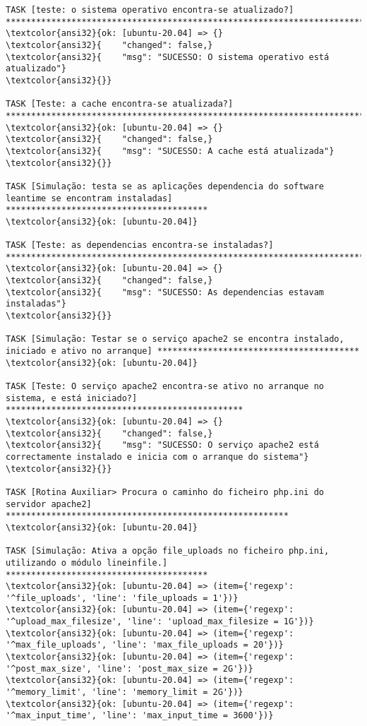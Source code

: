 \documentclass{scrartcl}
\begin{document}
\begin{Verbatim}
TASK [teste: o sistema operativo encontra-se atualizado?] ********************************************************************************
\textcolor{ansi32}{ok: [ubuntu-20.04] => {}
\textcolor{ansi32}{    "changed": false,}
\textcolor{ansi32}{    "msg": "SUCESSO: O sistema operativo está atualizado"}
\textcolor{ansi32}{}}

TASK [Teste: a cache encontra-se atualizada?] ********************************************************************************************
\textcolor{ansi32}{ok: [ubuntu-20.04] => {}
\textcolor{ansi32}{    "changed": false,}
\textcolor{ansi32}{    "msg": "SUCESSO: A cache está atualizada"}
\textcolor{ansi32}{}}

TASK [Simulação: testa se as aplicações dependencia do software leantime se encontram instaladas] ****************************************
\textcolor{ansi32}{ok: [ubuntu-20.04]}

TASK [Teste: as dependencias encontra-se instaladas?] ************************************************************************************
\textcolor{ansi32}{ok: [ubuntu-20.04] => {}
\textcolor{ansi32}{    "changed": false,}
\textcolor{ansi32}{    "msg": "SUCESSO: As dependencias estavam instaladas"}
\textcolor{ansi32}{}}

TASK [Simulação: Testar se o serviço apache2 se encontra instalado, iniciado e ativo no arranque] ****************************************
\textcolor{ansi32}{ok: [ubuntu-20.04]}

TASK [Teste: O serviço apache2 encontra-se ativo no arranque no sistema, e está iniciado?] ***********************************************
\textcolor{ansi32}{ok: [ubuntu-20.04] => {}
\textcolor{ansi32}{    "changed": false,}
\textcolor{ansi32}{    "msg": "SUCESSO: O serviço apache2 está correctamente instalado e inicia com o arranque do sistema"}
\textcolor{ansi32}{}}

TASK [Rotina Auxiliar> Procura o caminho do ficheiro php.ini do servidor apache2] ********************************************************
\textcolor{ansi32}{ok: [ubuntu-20.04]}

TASK [Simulação: Ativa a opção file_uploads no ficheiro php.ini, utilizando o módulo lineinfile.] ****************************************
\textcolor{ansi32}{ok: [ubuntu-20.04] => (item={'regexp': '^file_uploads', 'line': 'file_uploads = 1'})}
\textcolor{ansi32}{ok: [ubuntu-20.04] => (item={'regexp': '^upload_max_filesize', 'line': 'upload_max_filesize = 1G'})}
\textcolor{ansi32}{ok: [ubuntu-20.04] => (item={'regexp': '^max_file_uploads', 'line': 'max_file_uploads = 20'})}
\textcolor{ansi32}{ok: [ubuntu-20.04] => (item={'regexp': '^post_max_size', 'line': 'post_max_size = 2G'})}
\textcolor{ansi32}{ok: [ubuntu-20.04] => (item={'regexp': '^memory_limit', 'line': 'memory_limit = 2G'})}
\textcolor{ansi32}{ok: [ubuntu-20.04] => (item={'regexp': '^max_input_time', 'line': 'max_input_time = 3600'})}


\end{Verbatim}
\end{document}
